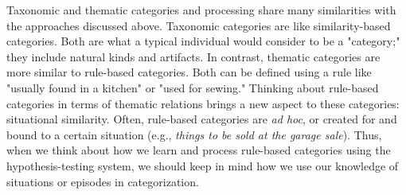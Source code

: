 \documentclass[../dissertation.tex]{subfiles}
\begin{document}
	Taxonomic and thematic categories and processing share many similarities with the approaches discussed above. Taxonomic categories are like similarity-based categories. Both are what a typical individual would consider to be a "category;" they include natural kinds and artifacts. In contrast, thematic categories are more similar to rule-based categories. Both can be defined using a rule like "usually found in a kitchen" or "used for sewing." Thinking about rule-based categories in terms of thematic relations brings a new aspect to these categories: situational similarity. Often, rule-based categories are \textit{ad hoc}, or created for and bound to a certain situation (e.g., \textit{things to be sold at the garage sale}). Thus, when we think about how we learn and process rule-based categories using the hypothesis-testing system, we should keep in mind how we use our knowledge of situations or episodes in categorization. \par
\end{document}
